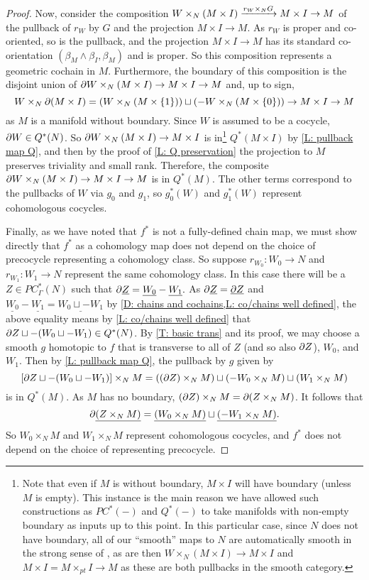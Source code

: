 \begin{proof}
	Now, consider the composition $W \times_N (M \times I) \xrightarrow{r_W \times_N G} M \times I \to M$ of the pullback of $r_W$ by $G$ and the projection $M \times I \to M$.
	As $r_W$ is proper and co-oriented, so is the pullback, and the projection $M \times I \to M$ has its standard co-orientation $(\beta_M \wedge \beta_I,\beta_M)$ and is proper.
	So this composition represents a geometric cochain in $M$.
	Furthermore, the boundary of this composition is the disjoint union of $\partial W \times_N (M \times I) \to M \times I \to M$ and, up to sign, $$W \times_N \partial(M \times I) = \left( W \times_N (M \times \{1\})\right) \sqcup \left(- W \times_N (M \times \{0\})\right) \to M \times I \to M$$ as $M$ is a manifold without boundary.
	Since $W$ is assumed to be a cocycle, $\partial W \in Q^*(N)$.
	So $\partial W \times_N (M \times I) \to M \times I$ is in\footnote{Note that even if $M$ is without boundary, $M \times I$ will have boundary (unless $M$ is empty).
	This instance is the main reason we have allowed such constructions as $PC^*(-)$ and $Q^*(-)$ to take manifolds with non-empty boundary as inputs up to this point.
	In this particular case, since $N$ does not have boundary, all of our ``smooth'' maps to $N$ are automatically smooth in the strong sense of \cite{Joy12}, as are then $W \times_N (M \times I) \to M \times I$ and $M \times I = M \times_{pt} I \to M$ as these are both pullbacks in the smooth category.}
	$Q^*(M \times I)$ by \cref{L: pullback map Q}, and then by the proof of \cref{L: Q preservation} the projection to $M$ preserves triviality and small rank.
	Therefore, the composite $\partial W \times_N (M \times I) \to M \times I \to M$ is in $Q^*(M)$.
	The other terms correspond to the pullbacks of $W$ via $g_0$ and $g_1$, so $g_0^*(W)$ and $g_1^*(W)$ represent cohomologous cocycles.

	Finally, as we have noted that $f^*$ is not a fully-defined chain map, we must show directly that $f^*$ as a cohomology map does not depend on the choice of precocycle representing a cohomology class.
	So suppose $r_{W_0} \colon W_0 \to N$ and $r_{W_1} \colon W_1 \to N$ represent the same cohomology class.
	In this case there will be a $Z \in PC^*_\Gamma(N)$ such that $\partial \underline{Z} = \underline{W_0} - \underline{W_1}.$
	As $\partial \underline{Z} = \underline{\partial Z}$ and $\underline{W_0} - \underline{W_1} = \underline{W_0 \sqcup - W_1}$ by \cref{D: chains and cochains,L: co/chains well defined}, the above equality means by \cref{L: co/chains well defined} that $\partial Z \sqcup -(W_0 \sqcup -W_1) \in Q^*(N)$.
	By \cref{T: basic trans} and its proof, we may choose a smooth $g$ homotopic to $f$ that is transverse to all of $Z$ (and so also $\partial Z$), $W_0$, and $W_1$.
	Then by \cref{L: pullback map Q}, the pullback by $g$ given by
	$$\left[\partial Z \sqcup -(W_0 \sqcup -W_1)\right] \times_N M = ((\partial Z) \times_N M) \sqcup (-W_0 \times_N M) \sqcup (W_1 \times_N M)$$
	is in $Q^*(M)$.
	As $M$ has no boundary, $(\partial Z) \times_N M = \partial (Z \times_N M)$.
	It follows that $$\partial \underline{(Z \times_N M)} = \underline{(W_0 \times_N M)} \sqcup \underline{(-W_1 \times_N M)}.$$
	So $W_0 \times_N M$ and $W_1 \times_N M$ represent cohomologous cocycles, and $f^*$ does not depend on the choice of representing precocycle.


\end{proof}
